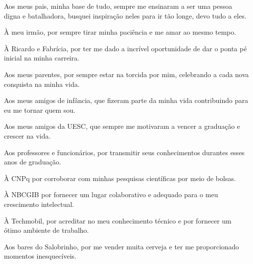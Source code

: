 \begin{agradecimentos}
Aos meus pais, minha base de tudo, sempre me ensinaram a ser uma pessoa digna e batalhadora, busquei inspiração neles para ir tão longe, devo tudo a eles.

À meu irmão, por sempre tirar minha paciência e me amar ao mesmo tempo.

À Ricardo e Fabrícia, por ter me dado a incrível oportunidade de dar o ponta pé inicial na minha carreira.

Aos meus parentes, por sempre estar na torcida por mim, celebrando a cada nova conquista na minha vida.

Aos meus amigos de infância, que fizeram parte da minha vida contribuindo para eu me tornar quem sou.

Aos meus amigos da UESC, que sempre me motivaram a vencer a graduação e crescer na vida.

Aos professores e funcionários, por transmitir seus conhecimentos durantes esses anos de graduação.

À CNPq por corroborar com minhas pesquisas científicas por meio de bolsas.

À NBCGIB por fornecer um lugar colaborativo e adequado para o meu crescimento intelectual.

À Techmobil, por acreditar no meu conhecimento técnico e por fornecer um ótimo ambiente de trabalho.

Aos bares do Salobrinho, por me vender muita cerveja e ter me proporcionado momentos inesquecíveis.

\end{agradecimentos}
